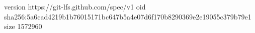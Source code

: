 version https://git-lfs.github.com/spec/v1
oid sha256:5a6cad4219b1b76015171bc647b5a4e07d6f170b8290369e2e19055c379b79e1
size 1572960
